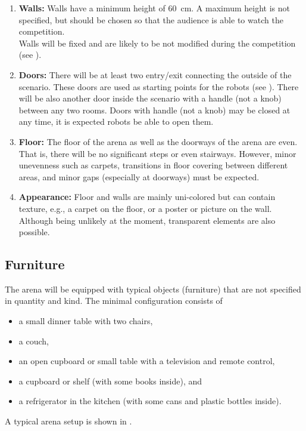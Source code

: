 \begin{enumerate}
	\item \textbf{Walls:} Walls have a minimum height of \SI{60}{\centi\meter}. A maximum height is not specified, but should be chosen so that the audience is able to watch the competition.\\
	Walls will be fixed and are likely to be not modified during the competition (see ). 

	\item \textbf{Doors:} There will be at least two entry/exit  connecting the outside of the scenario. These doors are used as starting points for the robots (see ).
	There will be also another door inside the scenario with a handle (not a knob) between any two rooms. Doors with handle (not a knob) may be closed at any time, it is expected robots be able to open them.

	\item \textbf{Floor:} The floor of the arena as well as the doorways of the arena are even. That is, there will be no significant steps or even stairways. However, minor unevenness such as carpets, transitions in floor covering between different areas, and minor gaps (especially at doorways) must be expected.

	\item \textbf{Appearance:} Floor and walls are mainly uni-colored but can contain texture, e.g., a carpet on the floor, or a poster or picture on the wall.\\
	Although being unlikely at the moment, transparent elements are also possible. 
\end{enumerate}


\subsection{Furniture}
\label{rule:scenario_furniture}

The arena will be equipped with typical objects (furniture) that are not specified in quantity and kind. The minimal configuration consists of 
\begin{itemize}
	\item a small dinner table with two chairs, 
	\item a couch, 
	\item an open cupboard or small table with a television and remote control, 
	\item a cupboard or shelf (with some books inside), and
	\item a refrigerator in the kitchen (with some cans and plastic bottles inside). 
\end{itemize}
A typical arena setup is shown in .

